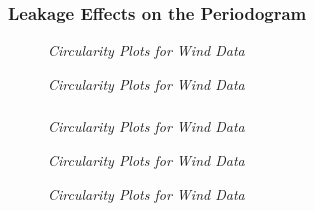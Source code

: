 \documentclass[./main.tex]{subfiles}
\begin{document}
\subsubsection{Leakage Effects on the Periodogram}

\begin{figure}[h]
	\centering 
	\resizebox{\textwidth}{!}{}
	\caption{\textit{Circularity Plots for Wind Data}}
	\label{fig:}
\end{figure}

\begin{figure}[h]
	\centering 
	\resizebox{\textwidth}{!}{}
	\caption{\textit{Circularity Plots for Wind Data}}
	\label{fig:}
\end{figure}

\subsubsection{}

\begin{figure}[h]
	\centering 
	\resizebox{\textwidth}{!}{}
	\caption{\textit{Circularity Plots for Wind Data}}
	\label{fig:}
\end{figure}

\begin{figure}[h]
	\centering 
	\resizebox{\textwidth}{!}{}
	\caption{\textit{Circularity Plots for Wind Data}}
	\label{fig:}
\end{figure}

\begin{figure}[h]
	\centering 
	\resizebox{\textwidth}{!}{}
	\caption{\textit{Circularity Plots for Wind Data}}
	\label{fig:}
\end{figure}
\end{document}
